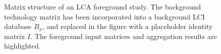 \begin{figure}
  \begin{center}
    
    \caption{Matrix structure of an LCA foreground study.  The background technology matrix has been incorporated into a background LCI database $B_x$, and replaced in the figure with a placeholder identity matrix $I$.  The foreground input matrices and aggregation results are highlighted.}
    \label{fig:foreground}
  \end{center}
\end{figure}
